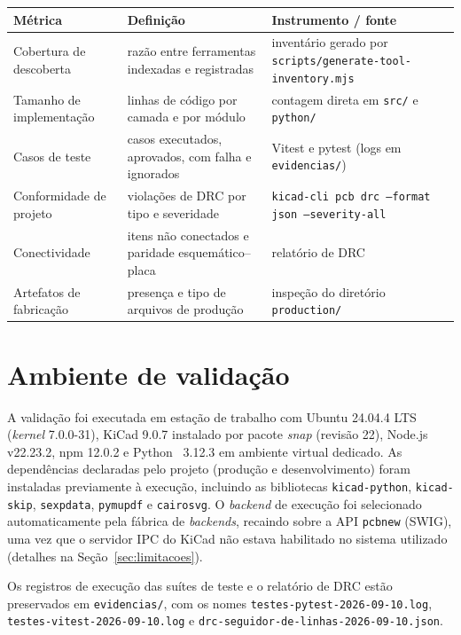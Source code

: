 \begin{quadro}[htbp]
\centering
\small
\caption{Métricas de avaliação e instrumentos de coleta.}
\label{qua:metricas}
\begin{tabular}{@{}p{3.8cm}p{6.2cm}p{3.9cm}@{}}
\toprule
\textbf{Métrica} & \textbf{Definição} & \textbf{Instrumento / fonte} \\
\midrule
Cobertura de descoberta & razão entre ferramentas indexadas e registradas & inventário gerado por \texttt{scripts/generate-tool-inventory.mjs} \\
Tamanho de implementação & linhas de código por camada e por módulo & contagem direta em \texttt{src/} e \texttt{python/} \\
Casos de teste & casos executados, aprovados, com falha e ignorados & Vitest e pytest (logs em \texttt{evidencias/}) \\
Conformidade de projeto & violações de DRC por tipo e severidade & \texttt{kicad-cli pcb drc --format json --severity-all} \\
Conectividade & itens não conectados e paridade esquemático--placa & relatório de DRC \\
Artefatos de fabricação & presença e tipo de arquivos de produção & inspeção do diretório \texttt{production/} \\
\bottomrule
\end{tabular}
\end{quadro}

\section{Ambiente de validação}

A validação foi executada em estação de trabalho com Ubuntu 24.04.4 LTS
(\emph{kernel} 7.0.0-31), KiCad 9.0.7 instalado por pacote \emph{snap}
(revisão 22), Node.js~\cite{nodejs} v22.23.2, npm 12.0.2 e
Python~\cite{python} 3.12.3 em ambiente virtual
dedicado. As dependências declaradas pelo projeto (produção e
desenvolvimento) foram instaladas previamente à execução, incluindo as
bibliotecas \texttt{kicad-python}, \texttt{kicad-skip}, \texttt{sexpdata},
\texttt{pymupdf} e \texttt{cairosvg}. O \emph{backend} de execução foi
selecionado automaticamente pela fábrica de \emph{backends}, recaindo sobre a
API \texttt{pcbnew} (SWIG), uma vez que o servidor IPC do KiCad não estava
habilitado no sistema utilizado (detalhes na Seção~\ref{sec:limitacoes}).

Os registros de execução das suítes de teste e o relatório de DRC estão
preservados em \texttt{evidencias/}, com os nomes
\texttt{testes-pytest-2026-09-10.log}, \texttt{testes-vitest-2026-09-10.log}
e \texttt{drc-seguidor-de-linhas-2026-09-10.json}.


